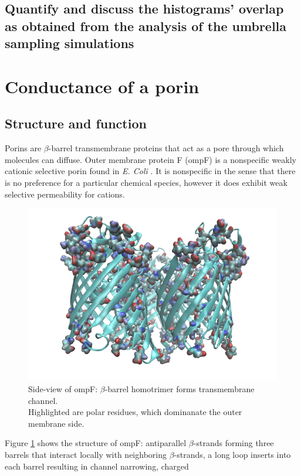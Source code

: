 \documentclass{article}[12pt]
\numberwithin{equation}{section}
\begin{document}
\subsection{Quantify and discuss the histograms’ overlap as
obtained from the analysis of the umbrella sampling simulations}
\pagebreak
\section{Conductance of a porin}
\vspace{-5pt}
\subsection{Structure and function}
Porins are $\beta$-barrel transmembrane proteins that act as a pore through
which molecules can diffuse. Outer membrane protein F (ompF) is a nonspecific
weakly cationic selective porin found in \textit{E. Coli} \cite{Novikova2009}.
It is nonspecific in the sense that there is no preference for a particular
chemical species, however it does exhibit weak selective permeability for
cations.
\begin{figure}[H]
	\centering{}
	\captionsetup{justification=centering}
	\includegraphics[scale=0.5]{ompf}
\caption{Side-view of ompF: $\beta$-barrel homotrimer forms transmembrane channel.\\
Highlighted are polar residues, which dominanate the outer membrane side.}
\label{fig:ompF}
\end{figure}\noindent
Figure \ref{fig:ompF} shows the structure of ompF: antiparallel $\beta$-strands
forming three barrels that interact locally with neighboring $\beta$-strands, a
long loop inserts into each barrel resulting in channel narrowing, charged
\end{document}
